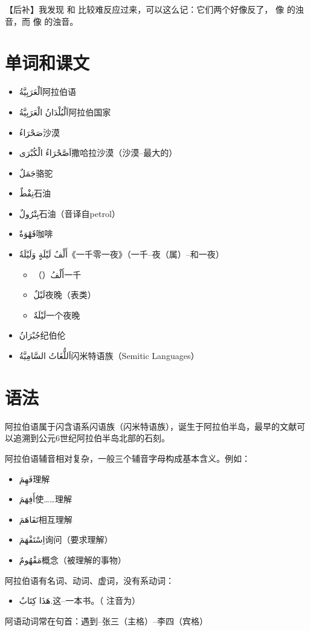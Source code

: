 \begin{note}
    【后补】我发现  和  比较难反应过来，可以这么记：它们两个好像反了，  像  的浊音，而  像  的浊音。
\end{note}

\section{单词和课文}

\begin{itemize}
    \item \ac{اَلْعَرَبِيَّةُ}{阿拉伯语}
    \item \ac{اَلْبُلْدَانُ الْعَرَبِيَّةُ}{阿拉伯国家}
    \item \ac{صَحْرَاءُ}{沙漠}
    \item \ac{اَصَّحْرَاءُ الْكُبْرَى}{撒哈拉沙漠（沙漠--最大的）}
    \item \ac{جَمَلٌ}{骆驼}
    \item \ac{نِفْطٌ}{石油}
    \item \ac{بِتْرُولٌ}{石油（音译自petrol）}
    \item \ac{قَهْوَةٌ}{咖啡}
    \item \ac{أَلْفُ لَيْلَةٍ وَلَيْلَةٌ}{《一千零一夜》（一千--夜（属）--和一夜）}
    \begin{itemize}
        \item （）\ac{أَلْفُ}{一千}
        \item \ac{لَيْلٌ}{夜晚（表类）}
        \item \ac{لَيْلَةٌ}{一个夜晚}
    \end{itemize}
    \item \ac{جُبْرَانُ}{纪伯伦}
    \item \ac{اَللُّغَاتُ السَّامِيَّةُ}{闪米特语族（Semitic Languages）}
\end{itemize}

\section{语法}

阿拉伯语属于闪含语系闪语族（闪米特语族），诞生于阿拉伯半岛，最早的文献可以追溯到公元6世纪阿拉伯半岛北部的石刻。

阿拉伯语辅音相对复杂，一般三个辅音字母构成基本含义。例如：

\begin{itemize}
    \item \ac{فَهِمَ}{理解}
    \item \ac{أَفِهَمَ}{使……理解}
    \item \ac{تَفَاهَمَ}{相互理解}
    \item \ac{اِسْتَفْهَمَ}{询问（要求理解）}
    \item \ac{مَفْهُومٌ}{概念（被理解的事物）}
\end{itemize}

阿拉伯语有名词、动词、虚词，没有系动词：

\begin{itemize}
    \item \ac{هَذَا كِتَابٌ.}{这--一本书。（  注音为）}
\end{itemize}

阿语动词常在句首：遇到--张三（主格）--李四（宾格）
